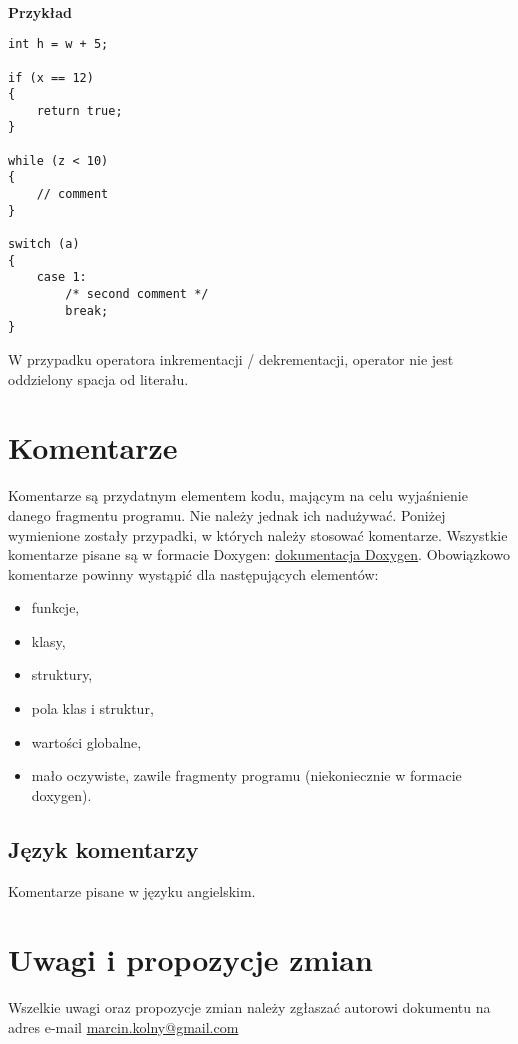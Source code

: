 \documentclass[titlepage]{article}
\begin{document}
\paragraph{}
\textbf{Przykład}
\begin{lstlisting}
int h = w + 5;

if (x == 12)
{
	return true;
}

while (z < 10)
{
	// comment
}

switch (a)
{
	case 1:
		/* second comment */
		break;
}
\end{lstlisting}
W przypadku operatora inkrementacji / dekrementacji, operator nie jest oddzielony spacja od literału.
\section{Komentarze}
Komentarze są przydatnym elementem kodu, mającym na celu wyjaśnienie danego fragmentu programu. Nie należy jednak ich nadużywać. Poniżej wymienione zostały przypadki, w których należy stosować komentarze. 
Wszystkie komentarze pisane są w formacie Doxygen: \href{http://doxygen.org/}{dokumentacja Doxygen}.
Obowiązkowo komentarze powinny wystąpić dla następujących elementów:
\begin{itemize}
\item funkcje,
\item klasy,
\item struktury,
\item pola klas i struktur,
\item wartości globalne,
\item mało oczywiste, zawile fragmenty programu (niekoniecznie w formacie doxygen).
\end{itemize}

\subsection{Język komentarzy}
Komentarze pisane w języku angielskim.
\section{Uwagi i propozycje zmian}
Wszelkie uwagi oraz propozycje zmian należy zgłaszać autorowi dokumentu na adres e-mail \href{mailto:marcin.kolny@gmail.com}{marcin.kolny@gmail.com}
\end{document}
